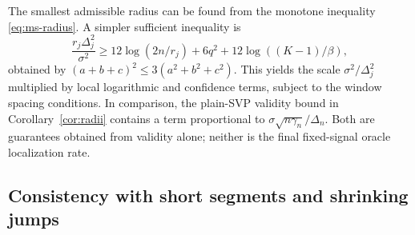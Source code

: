 \documentclass[pdflatex,sn-mathphys-num]{sn-jnl}
\theoremstyle{thmstyleone}
\theoremstyle{thmstyletwo}
\begin{document}
The smallest admissible radius can be found from the monotone inequality
\eqref{eq:ms-radius}. A simpler sufficient inequality is
\begin{equation}\label{eq:ms-radius-sufficient}
\frac{r_j\Delta_j^2}{\sigma^2}
\ge12\log(2n/r_j)+6q^2+12\log((K-1)/\beta),
\end{equation}
obtained by $(a+b+c)^2\le3(a^2+b^2+c^2)$.
This yields the scale $\sigma^2/\Delta_j^2$ multiplied by local logarithmic
and confidence terms, subject to the window spacing conditions. In
comparison, the plain-SVP validity bound in Corollary~\ref{cor:radii}
contains a term proportional to $\sigma\sqrt{n\gamma_n}/\Delta_n$.
Both are guarantees obtained from validity alone; neither is the final
fixed-signal oracle localization rate.

\subsection{Consistency with short segments and shrinking jumps}
\end{document}
